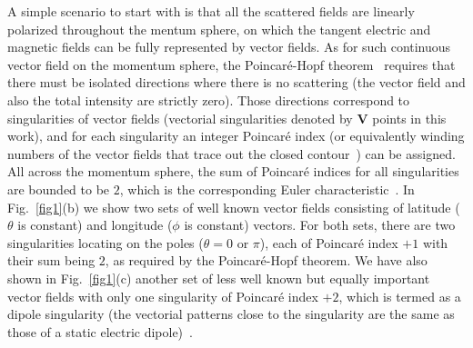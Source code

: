 \documentclass[aps,twocolumn,superscriptaddress]{revtex4-1}
\newcounter{Fig}
\begin{document}
A simple scenario to start with is that all the scattered fields are linearly polarized throughout the mentum sphere, on which the tangent electric and magnetic fields can be fully represented by vector fields. As for such continuous vector field on the momentum sphere, the Poincar\'{e}-Hopf theorem~\cite{MILNOR_1997__Topology,NEEDHAM_1998__Visual} requires that there must be isolated directions where there is no scattering (the vector field and also the total intensity are strictly zero). Those directions correspond to singularities of vector fields (vectorial singularities denoted by \textbf{V} points in this work), and for each singularity an integer Poincar\'{e} index (or equivalently winding numbers of the vector fields that trace out the closed contour~\cite{NEEDHAM_1998__Visual}) can be assigned.  All across the momentum sphere, the  sum of Poincar\'{e} indices  for all singularities are bounded to be $2$, which is the corresponding Euler characteristic~\cite{MILNOR_1997__Topology,NEEDHAM_1998__Visual}. In Fig.~\ref{fig1}(b) we show two sets of well known vector fields consisting of latitude ($\theta$ is constant) and longitude ($\phi$ is constant) vectors. For both sets, there are two singularities locating on the poles ($\theta=0$ or $\pi$), each of Poincar\'{e} index $+1$ with their sum being $2$, as required by the Poincar\'{e}-Hopf theorem. We have also shown in Fig.~\ref{fig1}(c) another set of less well known but equally important vector fields with only one singularity of Poincar\'{e} index $+2$, which is termed as a dipole singularity (the  vectorial patterns close to the singularity are the same as those of a static electric dipole)~\cite{NEEDHAM_1998__Visual}.
\end{document}
